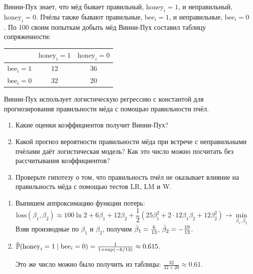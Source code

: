 \begin{problem}
Винни-Пух знает, что мёд бывает правильный, $\text{honey}_i=1$, и неправильный, $\text{honey}_i=0$. 
Пчёлы также бывают правильные, $\text{bee}_i=1$, и неправильные, $\text{bee}_i=0$. 
По 100 своим попыткам добыть мёд Винни-Пух составил таблицу сопряженности:

\begin{tabular}{c|cc}
\toprule
 & $\text{honey}_i=1$ & $\text{honey}_i=0$ \\
\midrule
$\text{bee}_i=1$ & 12 & 36 \\
$\text{bee}_i=0$ & 32 & 20 \\
\bottomrule
\end{tabular}

Винни-Пух использует логистическую регрессию с константой для прогнозирования правильности мёда с помощью правильности пчёл.

\begin{enumerate}
\item Какие оценки коэффициентов получит Винни-Пух?
\item Какой прогноз вероятности правильности мёда при встрече с неправильными пчёлами даёт логистическая модель? Как это число можно посчитать без рассчитывания коэффициентов?
\item Проверьте гипотезу о том, что правильность пчёл не оказывает влияние на правильность мёда с помощью тестов LR, LM и W.
\end{enumerate}

\begin{sol}
\begin{enumerate}
\item Выпишем аппроксимацию функции потерь:
\[
\text{loss}(\beta_1, \beta_2) \approx 100 \ln 2 + 6 \beta_1 + 12 \beta_2 + \frac{1}{2}(25 \beta_1^2 + 2 \cdot 12 \beta_1 \beta_2 + 12 \beta_2^2) \to \min_{\beta_1, \beta_2}
\]
Взяв производные по $\beta_1$ и $\beta_2$, получим $\hb_1 = \frac{6}{13}$, $\hb_2 = - \frac{19}{13}$.
\item $\hat{\P}(\text{honey}_i = 1 \mid \text{bee}_i = 0) = \frac{1}{1+\exp(-6/13)} \approx 0.615$.

Это же число можно было получить из таблицы: $\frac{32}{32 + 20} \approx 0.61$.
\end{enumerate}
\end{sol}
\end{problem}


